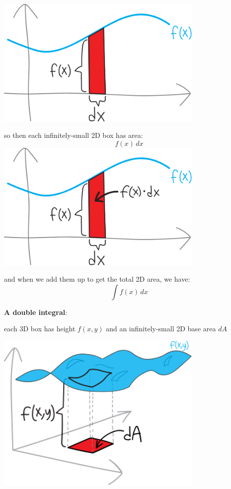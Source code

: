 \documentclass[
]{article}
\begin{document}
\includegraphics[width=0.75\textwidth,height=\textheight]{2d-integral-1.svg}

so then each infinitely-small 2D box has area: \[f(x)\,dx\] \includegraphics[width=0.75\textwidth,height=\textheight]{2d-integral-2.svg}

and when we add them up to get the total 2D area, we have: \[\int f(x)\,dx\]

\textbf{A double integral}:

each 3D box has height \(f(x,y)\) and an infinitely-small 2D base area \(dA\)

\includegraphics[width=0.75\textwidth,height=\textheight]{3d-integral-1-1.svg}
\end{document}
